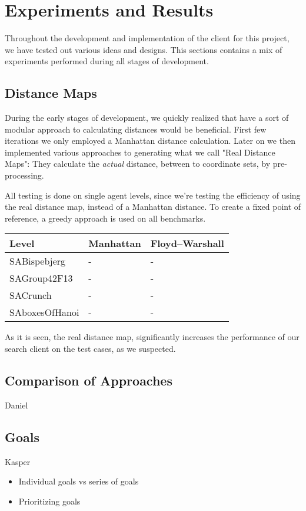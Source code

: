 \documentclass[letterpaper]{article}
\begin{document}
\section{Experiments and Results}
	Throughout the development and implementation of the client for this project, we have tested out various ideas and designs. This sections contains a mix of experiments performed during all stages of development.

	\subsection{Distance Maps}
		During the early stages of development, we quickly realized that have a sort of modular approach to calculating distances would be beneficial. First few iterations we only employed a Manhattan distance calculation. Later on we then implemented various approaches to generating what we call "Real Distance Maps": They calculate the \emph{actual} distance, between to coordinate sets, by pre-processing.

		All testing is done on single agent levels, since we're testing the efficiency of using the real distance map, instead of a Manhattan distance. To create a fixed point of reference, a greedy approach is used on all benchmarks.
		\begin{tabular}{ | l | l | l | }
			\hline
			\textbf{Level} 	& \textbf{Manhattan} 	& \textbf{Floyd–Warshall} \\
			\hline
			SABispebjerg 	& - 					& - \\
			SAGroup42F13 	& - 					& - \\
			SACrunch 		& - 					& - \\
			SAboxesOfHanoi 	& - 					& - \\
			\hline
		\end{tabular}
		As it is seen, the real distance map, significantly increases the performance of our search client on the test cases, as we suspected.

	\subsection{Comparison of Approaches}
		Daniel

	\subsection{Goals}
		Kasper
		\begin{itemize}
			\item{Individual goals vs series of goals}
			\item{Prioritizing goals}
		\end{itemize}
\end{document}
